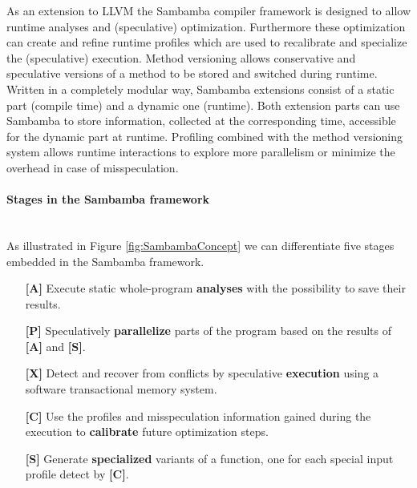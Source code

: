As an extension to LLVM the Sambamba compiler framework is designed to
allow runtime analyses and (speculative) optimization.
Furthermore these optimization can create and refine runtime profiles which
are used to recalibrate and specialize the (speculative) execution. Method 
versioning allows conservative and speculative 
versions of a method to be stored and switched during runtime. 
Written in a completely modular way, Sambamba extensions consist 
of a static part (compile time) and a dynamic one (runtime). 
Both extension parts can use Sambamba to store information,
collected at the corresponding time, accessible for the dynamic part at 
runtime.
Profiling combined with the method versioning system allows runtime interactions
to explore more parallelism or minimize the overhead in case of misspeculation. 

\paragraph{Stages in the Sambamba framework\\} ~\\
As illustrated in Figure \ref{fig:SambambaConcept} we can differentiate five stages
embedded in the Sambamba framework.

{\begin{list}{}
    {\setlength{\leftmargin}{-0mm}}
  \item[]
\begin{enumerate}
  \item[\textbf{[A]}] Execute static whole-program \textbf{analyses}  
  with the possibility to save their results.
\item[\textbf{[P]}] Speculatively \textbf{parallelize} parts of the program
  based on the results of \textbf{[A]} and \textbf{[S]}.
\item[\textbf{[X]}] Detect and recover from conflicts by speculative
  \textbf{execution} using a software transactional memory system.
\item[\textbf{[C]}] Use the profiles and misspeculation information gained 
  during the execution to \textbf{calibrate} future optimization steps.
\item[\textbf{[S]}] Generate \textbf{specialized} variants of a function, 
 one for each special input profile detect by \textbf{[C]}. 
\end{enumerate}
\end{list}
}




